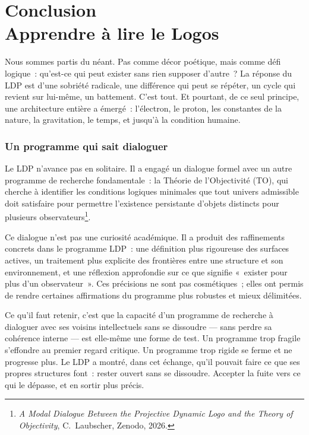 \documentclass[12pt, a4paper, openright]{book}
\begin{document}
\chapter[Conclusion -- Apprendre à lire le Logos]{Conclusion \\ Apprendre à lire le Logos}

Nous sommes partis du néant. Pas comme décor poétique, mais comme défi logique~: qu'est-ce qui peut exister sans rien supposer d'autre~? La réponse du LDP est d'une sobriété radicale, une différence qui peut se répéter, un cycle qui revient sur lui-même, un battement. C'est tout. Et pourtant, de ce seul principe, une architecture entière a émergé~: l'électron, le proton, les constantes de la nature, la gravitation, le temps, et jusqu'à la condition humaine.

\subsection*{Un programme qui sait dialoguer}

Le LDP n'avance pas en solitaire. Il a engagé un dialogue formel avec un autre programme de recherche fondamentale~: la Théorie de l'Objectivité (TO), qui cherche à identifier les conditions logiques minimales que tout univers admissible doit satisfaire pour permettre l'existence persistante d'objets distincts pour plusieurs observateurs\footnote{\textit{A Modal Dialogue Between the Projective Dynamic Logo and the Theory of Objectivity}, C.~Laubscher, Zenodo, 2026.}.

\medskip

Ce dialogue n'est pas une curiosité académique. Il a produit des raffinements concrets dans le programme LDP~: une définition plus rigoureuse des surfaces actives, un traitement plus explicite des frontières entre une structure et son environnement, et une réflexion approfondie sur ce que signifie «~exister pour plus d'un observateur~». Ces précisions ne sont pas cosmétiques~; elles ont permis de rendre certaines affirmations du programme plus robustes et mieux délimitées.

\medskip

Ce qu'il faut retenir, c'est que la capacité d'un programme de recherche à dialoguer avec ses voisins intellectuels sans se dissoudre --- sans perdre sa cohérence interne --- est elle-même une forme de test. Un programme trop fragile s'effondre au premier regard critique. Un programme trop rigide se ferme et ne progresse plus. Le LDP a montré, dans cet échange, qu'il pouvait faire ce que ses propres structures font~: rester ouvert sans se dissoudre. Accepter la fuite vers ce qui le dépasse, et en sortir plus précis.
\end{document}
